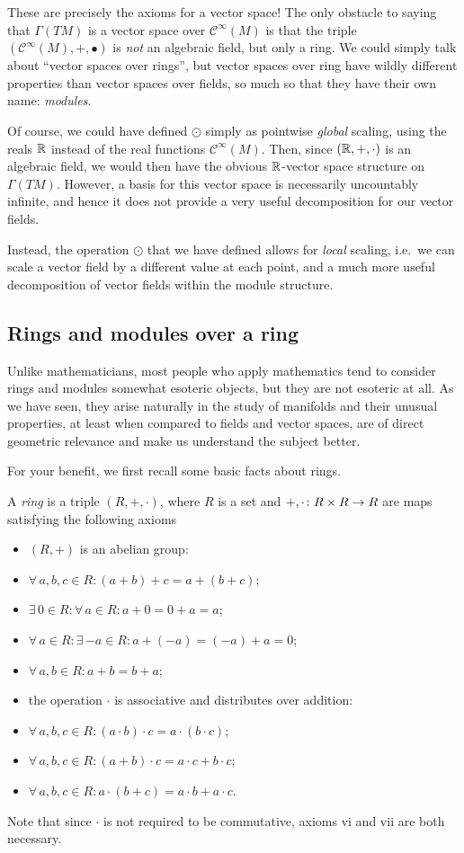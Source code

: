These are precisely the axioms for a vector space! The only obstacle to saying that $\Gamma(TM)$ is a vector space over $\mathcal{C}^\infty(M)$ is that the triple $(\mathcal{C}^\infty(M),+,\bullet)$ is \emph{not} an algebraic field, but only a ring. We could simply talk about ``vector spaces over rings'', but vector spaces over ring have wildly different properties than vector spaces over fields, so much so that they have their own name: \emph{modules}.

\br
Of course, we could have defined $\odot$ simply as pointwise \emph{global} scaling, using the reals $\mathbb{R}$ instead of the real functions $\mathcal{C}^\infty(M)$.
Then, since $(\mathbb{R},+,\cdot)$ is an algebraic field, we would then have the obvious $\mathbb{R}$-vector space structure on $\Gamma(TM)$. However, a basis for this vector space is necessarily uncountably infinite, and hence it does not provide a very useful decomposition for our vector fields.

Instead, the operation $\odot$ that we have defined allows for \emph{local} scaling, i.e.\ we can scale a vector field by a different value at each point, and a much more useful decomposition of vector fields within the module structure.
\er


\subsection{Rings and modules over a ring}

Unlike mathematicians, most people who apply mathematics tend to consider rings and modules somewhat esoteric objects, but they are not esoteric at all. As we have seen, they arise naturally in the study of manifolds and their unusual properties, at least when compared to fields and vector spaces, are of direct geometric relevance and make us understand the subject better.

For your benefit, we first recall some basic facts about rings.

\bd
A \emph{ring} is a triple $(R,+,\cdot)$, where $R$ is a set and $+,\cdot\colon R\times R\to R$ are maps satisfying the following axioms
\begin{itemize}
\item $(R,+)$ is an abelian group:
\ben[label=\roman*)]
\item $\forall \, a,b,c \in R : (a+b)+c=a+(b+c)$;
\item $\exists \, 0 \in R : \forall \, a \in R : a+0=0+a=a$;
\item $\forall \, a \in R : \exists \, {-a} \in R : a+(-a)=(-a)+a=0$;
\item $\forall \, a,b \in R : a+b=b+a$;
\een
\item the operation $\cdot$ is associative and distributes over addition:
\ben[label=\roman*),start=5]
\item $\forall \, a,b,c \in R : (a\cdot b)\cdot c=a\cdot (b\cdot c)$;
\item $\forall \, a,b,c \in R : (a+ b)\cdot c=a\cdot c + b\cdot c$;
\item $\forall \, a,b,c \in R : a \cdot (b+c)=a\cdot b + a\cdot c$.
\een
\end{itemize}
Note that since $\cdot$ is not required to be commutative, axioms vi and vii are both necessary.
\ed

